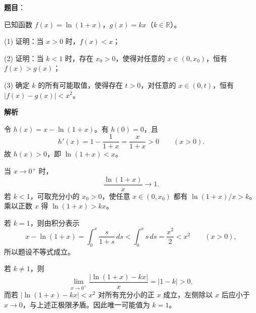 \begin{answer}

\textbf{题目}：

已知函数 $f(x)=\ln(1+x)$，$g(x)=kx$（$k\in\mathbb{R}$）。

(1) 证明：当 $x>0$ 时，$f(x)<x$；

(2) 证明：当 $k<1$ 时，存在 $x_0>0$，使得对任意的 $x\in(0,x_0)$，恒有 $f(x)>g(x)$；

(3) 确定 $k$ 的所有可能取值，使得存在 $t>0$，对任意的 $x\in(0,t)$，恒有 $|f(x)-g(x)|<x^2$。

\textbf{解析}


令 $h(x)=x-\ln(1+x)$。有 $h(0)=0$，且
\nopagebreak[4]
\[
h'(x)=1-\frac1{1+x}=\frac{x}{1+x}>0\qquad(x>0).
\]
故 $h(x)>0$，即 $\ln(1+x)<x$。


当 $x\to0^+$ 时，
\nopagebreak[4]
\[
\frac{\ln(1+x)}{x}\longrightarrow1.
\]
若 $k<1$，可取充分小的 $x_0>0$，使任意 $x\in(0,x_0)$ 都有 $\ln(1+x)/x>k$。乘以正数 $x$ 得 $\ln(1+x)>kx$。


若 $k=1$，则由积分表示
\nopagebreak[4]
\[
x-\ln(1+x)=\int_0^x\frac{s}{1+s}\,ds
<\int_0^x s\,ds=\frac{x^2}{2}<x^2\qquad(x>0),
\]
所以题设不等式成立。

若 $k\ne1$，则
\nopagebreak[4]
\[
\lim_{x\to0^+}\frac{|\ln(1+x)-kx|}{x}
=|1-k|>0,
\]
而若 $|\ln(1+x)-kx|<x^2$ 对所有充分小的正 $x$ 成立，左侧除以 $x$ 后应小于 $x\to0$，与上述正极限矛盾。因此唯一可能值为 $k=1$。




\end{answer}
